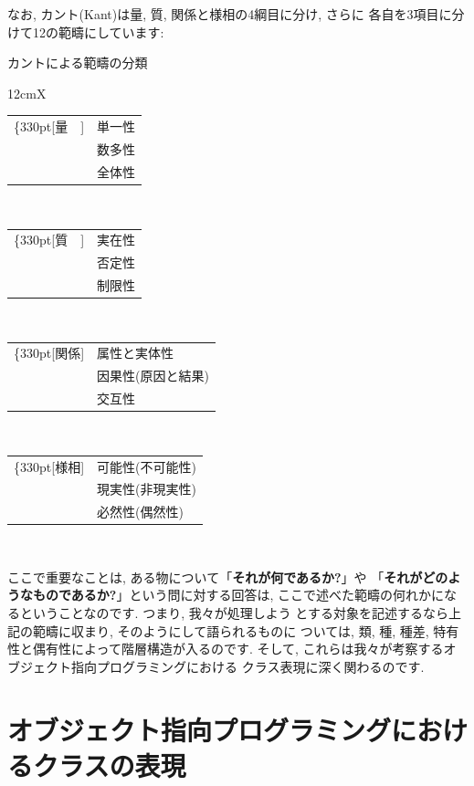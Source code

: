 \documentclass[b5j,8pt,twocolumn]{ltjsarticle}
\begin{document}
なお, カント(Kant)は量, 質, 関係と様相の4綱目に分け, さらに
各自を3項目に分けて12の範疇にしています:


\begin{itembox}[c]{カントによる範疇の分類}
{\footnotesize
\begin{tabularx}{12cm}{X}
\begin{tabular}[t]{rl}
\ldelim\{{3}{30pt}[量　]&
単一性\\
&数多性\\
&全体性\\
\end{tabular}
\\
\begin{tabular}[t]{rl}
\ldelim\{{3}{30pt}[質　]&
実在性\\
&否定性\\
&制限性\\
\end{tabular}
\\
\begin{tabular}[t]{rl}
\ldelim\{{3}{30pt}[関係]&
属性と実体性\\
&因果性(原因と結果)\\
&交互性\\
\end{tabular}
\\
\begin{tabular}[t]{rl}
\ldelim\{{3}{30pt}[様相]&
可能性(不可能性)\\
&現実性(非現実性)\\
&必然性(偶然性)\\
\end{tabular}
\\
\end{tabularx}
}
\end{itembox}


ここで重要なことは, ある物について「\textbf{それが何であるか?}」や
「\textbf{それがどのようなものであるか?}」という問に対する回答は,
 ここで述べた範疇の何れかになるということなのです. つまり, 我々が処理しよう
とする対象を記述するなら上記の範疇に収まり, そのようにして語られるものに
ついては, 類, 種, 種差, 特有性と偶有性によって階層構造が入るのです.
 そして, これらは我々が考察するオブジェクト指向プログラミングにおける
クラス表現に深く関わるのです.

\section{オブジェクト指向プログラミングにおけるクラスの表現}
\end{document}
